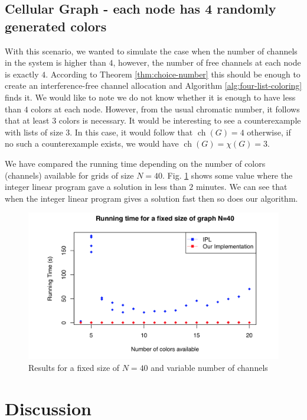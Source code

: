 \documentclass[letterpaper, 10 pt, conference]{ieeeconf}  %
\DeclareMathOperator*{\ch}{ch}
\begin{document}
\subsection{Cellular Graph - each node has 4 randomly generated colors}

With this scenario, we wanted to simulate the case when the number of channels in the system is higher than $4$, however, the number of free channels at each node is exactly $4$. According to Theorem \ref{thm:choice-number} this should be enough to create an interference-free channel allocation and Algorithm \ref{alg:four-list-coloring} finds it. We would like to note we do not know whether it is enough to have less than $4$ colors at each node. However, from the usual chromatic number, it follows that at least $3$ colors is necessary. It would be interesting to see a counterexample with lists of size $3$. In this case, it would follow that $\ch(G)=4$ otherwise, if no such a counterexample exists, we would have $\ch(G) = \chi(G)=3$.

We have compared the running time depending on the number of colors (channels) available for grids of size $N=40$. Fig. \ref{20size} shows some value where the integer linear program gave a solution in less than $2$ minutes. We can see that when the integer linear program gives a solution fast then so does our algorithm.

\begin{figure}[!h]
\centering
\includegraphics[scale=0.4]{40SizeRunTime.png}
\caption{Results for a fixed size of $N=40$ and variable number of channels}
\label{20size}
\end{figure}

\section{Discussion}\label{sec:disc}
\end{document}
